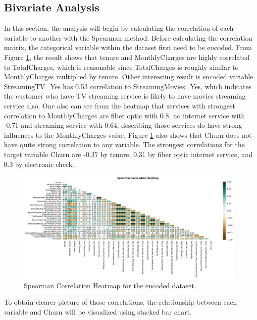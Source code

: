 \subsection{Bivariate Analysis}
In this section, the analysis will begin by calculating the correlation of each variable to another with the Spearman method. Before calculating the correlation matrix, the categorical variable within the dataset first need to be encoded. From Figure \ref{fig:spearmancor}, the result shows that tenure and MonthlyCharges are highly correlated to TotalCharges, which is reasonable since TotalCharges is roughly similar to MonthlyCharges multiplied by tenure. Other interesting result is encoded variable StreamingTV\_Yes has 0.53 correlation to StreamingMovies\_Yes, which indicates the customer who have TV streaming service is likely to have movies streaming service also. One also can see from the heatmap that services with strongest correlation to MonthlyCharges are fiber optic with 0.8, no internet service with -0.71 and streaming service with 0.64, describing those services do have strong influences to the MonthlyCharges value. Figure \ref{fig:spearmancor} also shows that Churn does not have quite strong correlation to any variable. The strongest correlations for the target variable Churn are -0.37 by tenure, 0.31 by fiber optic internet service, and 0.3 by electronic check.
\begin{landscape}
\begin{figure}[!htbp]
	\centering
	\includegraphics[width=25cm]{figures/spearman_cor}
	\caption{Spearman Correlation Heatmap for the encoded dataset.}
	\label{fig:spearmancor}
\end{figure}
\end{landscape}
 To obtain clearer picture of those correlations, the relationship between each variable and Churn will be visualized using stacked bar chart.

